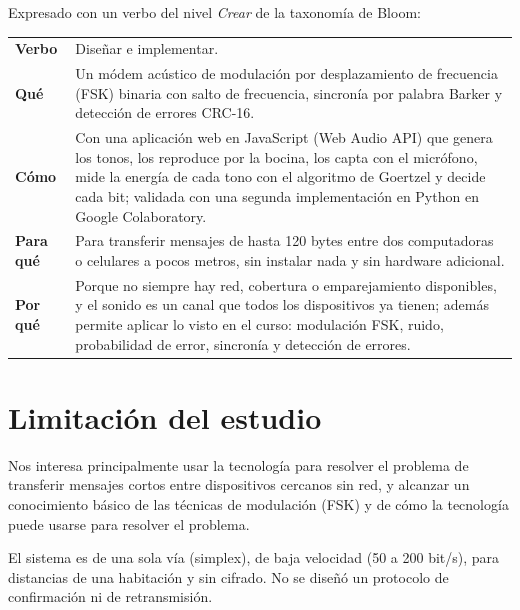 \documentclass[10pt,twocolumn,letterpaper]{article}
\begin{document}
\medskip
Expresado con un verbo del nivel \emph{Crear} de la taxonomía de Bloom:

\noindent\begin{tabularx}{\linewidth}{@{}>{\bfseries}p{2.3cm}X@{}}
\toprule
Verbo & Diseñar e implementar. \\
Qué & Un módem acústico de modulación por desplazamiento de frecuencia (FSK) binaria con salto de frecuencia, sincronía por palabra Barker y detección de errores CRC-16. \\
Cómo & Con una aplicación web en JavaScript (Web Audio API) que genera los tonos, los reproduce por la bocina, los capta con el micrófono, mide la energía de cada tono con el algoritmo de Goertzel y decide cada bit; validada con una segunda implementación en Python en Google Colaboratory. \\
Para qué & Para transferir mensajes de hasta 120 bytes entre dos computadoras o celulares a pocos metros, sin instalar nada y sin hardware adicional. \\
Por qué & Porque no siempre hay red, cobertura o emparejamiento disponibles, y el sonido es un canal que todos los dispositivos ya tienen; además permite aplicar lo visto en el curso: modulación FSK, ruido, probabilidad de error, sincronía y detección de errores. \\
\bottomrule
\end{tabularx}

\section*{Limitación del estudio}
Nos interesa principalmente usar la tecnología para resolver el problema de transferir mensajes cortos entre dispositivos cercanos sin red, y alcanzar un conocimiento básico de las técnicas de modulación (FSK) y de cómo la tecnología puede usarse para resolver el problema.

El sistema es de una sola vía (simplex), de baja velocidad (50 a 200 bit/s), para distancias de una habitación y sin cifrado. No se diseñó un protocolo de confirmación ni de retransmisión.
\end{document}
